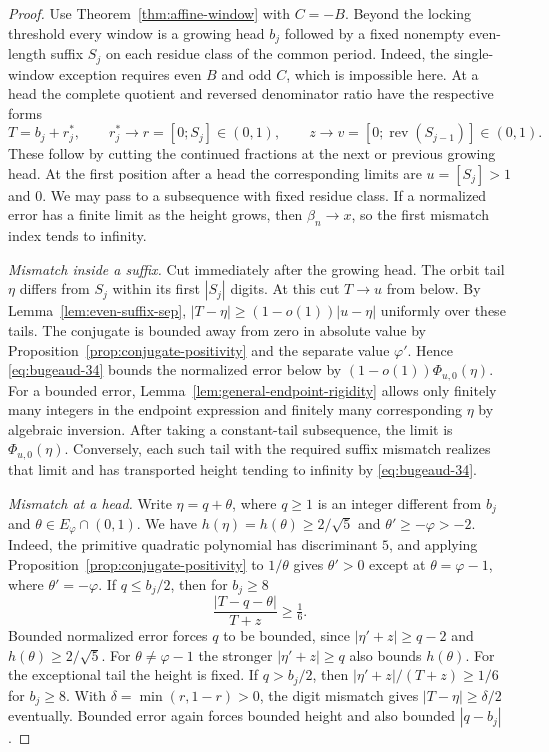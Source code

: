\documentclass[11pt]{amsart}
\theoremstyle{definition}
\theoremstyle{remark}
\numberwithin{equation}{section}
\begin{document}
\begin{proof}
Use Theorem~\ref{thm:affine-window} with $C=-B$. Beyond the locking
threshold every window is a growing head $b_j$ followed by a fixed
nonempty even-length suffix $S_j$ on each residue class of the common
period. Indeed, the single-window exception requires even $B$ and odd
$C$, which is impossible here. At a head the complete quotient and
reversed denominator ratio have the respective forms
\[
 T=b_j+r_j^*,\qquad r_j^*\longrightarrow r=[0;S_j]\in(0,1),
 \qquad z\longrightarrow v=[0;\operatorname{rev}(S_{j-1})]\in(0,1).
\]
These follow by cutting the continued fractions at the next or
previous growing head. At the first position after a head the
corresponding limits are $u=[S_j]>1$ and $0$. We may pass to a
subsequence with fixed residue class. If a normalized error has a finite
limit as the height grows, then $\beta_n\to x$, so the first mismatch
index tends to infinity.

\emph{Mismatch inside a suffix.} Cut immediately after the growing
head. The orbit tail $\eta$ differs from $S_j$ within its first
$|S_j|$ digits. At this cut $T\to u$ from below. By
Lemma~\ref{lem:even-suffix-sep}, $|T-\eta|\ge(1-o(1))|u-\eta|$
uniformly over these tails. The conjugate is bounded away from zero
in absolute value by Proposition~\ref{prop:conjugate-positivity}
and the separate value $\varphi'$. Hence \eqref{eq:bugeaud-34}
bounds the normalized error below by $(1-o(1))\Phi_{u,0}(\eta)$.
For a bounded error, Lemma~\ref{lem:general-endpoint-rigidity}
allows only finitely many integers in the endpoint expression and
finitely many corresponding $\eta$ by algebraic inversion.
After taking a constant-tail subsequence, the limit is
$\Phi_{u,0}(\eta)$. Conversely, each such tail with the required suffix
mismatch realizes that limit and has transported height tending to
infinity by \eqref{eq:bugeaud-34}.

\emph{Mismatch at a head.} Write $\eta=q+\theta$, where $q\ge1$ is an
integer different from $b_j$ and $\theta\in E_\varphi\cap(0,1)$. We have
$h(\eta)=h(\theta)\ge2/\sqrt5$ and $\theta'\ge-\varphi>-2$.
Indeed, the primitive quadratic polynomial has discriminant $5$,
and applying Proposition~\ref{prop:conjugate-positivity} to
$1/\theta$ gives $\theta'>0$ except at $\theta=\varphi-1$,
where $\theta'=-\varphi$. If $q\le b_j/2$, then for $b_j\ge8$
\[
 \frac{|T-q-\theta|}{T+z}\ge\tfrac16.
\]
Bounded normalized error forces $q$ to be bounded, since
$|\eta'+z|\ge q-2$ and $h(\theta)\ge2/\sqrt5$. For
$\theta\ne\varphi-1$ the stronger $|\eta'+z|\ge q$ also bounds
$h(\theta)$. For the exceptional tail the height is fixed.
If $q>b_j/2$, then $|\eta'+z|/(T+z)\ge1/6$ for $b_j\ge8$.
With $\delta=\min(r,1-r)>0$, the digit mismatch gives
$|T-\eta|\ge\delta/2$ eventually. Bounded error again forces bounded
height and also bounded $|q-b_j|$.


\end{proof}
\end{document}
